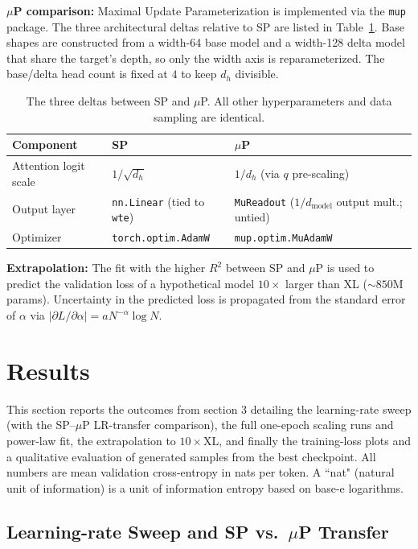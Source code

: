\documentclass[a4paper]{article}
\begin{document}
\textbf{$\mu$P comparison:} Maximal Update Parameterization is implemented via the \texttt{mup} package. The three architectural deltas relative to SP are listed in Table~\ref{tab:mup_deltas}. Base shapes are constructed from a width-64 base model and a width-128 delta model that share the target's depth, so only the width axis is reparameterized. The base/delta head count is fixed at $4$ to keep $d_h$ divisible.

\begin{table}[H]
\centering
\small
\begin{tabular}{lll}
\toprule
Component & SP & $\mu$P \\
\midrule
Attention logit scale & $1/\sqrt{d_h}$ & $1/d_h$ (via $q$ pre-scaling) \\
Output layer          & \texttt{nn.Linear} (tied to \texttt{wte}) & \texttt{MuReadout} ($1/d_{\text{model}}$ output mult.; untied) \\
Optimizer             & \texttt{torch.optim.AdamW} & \texttt{mup.optim.MuAdamW} \\
\bottomrule
\end{tabular}
\caption{The three deltas between SP and $\mu$P. All other hyperparameters and data sampling are identical.}
\label{tab:mup_deltas}
\end{table}

\textbf{Extrapolation:} The fit with the higher $R^2$ between SP and $\mu$P is used to predict the validation loss of a hypothetical model $10\times$ larger than XL ($\sim$$850$M params). Uncertainty in the predicted loss is propagated from the standard error of $\alpha$ via $|\partial L / \partial \alpha| = a N^{-\alpha} \log N$.


\section{Results}

This section reports the outcomes from section 3 detailing the learning-rate sweep (with the SP--$\mu$P LR-transfer comparison), the full one-epoch scaling runs and power-law fit, the extrapolation to $10\times$XL, and finally the training-loss plots and a qualitative evaluation of generated samples from the best checkpoint. All numbers are mean validation cross-entropy in nats per token. A ``nat" (natural unit of information) is a unit of information entropy based on base-e logarithms.

\subsection{Learning-rate Sweep and SP vs.\ $\mu$P Transfer}
\end{document}
